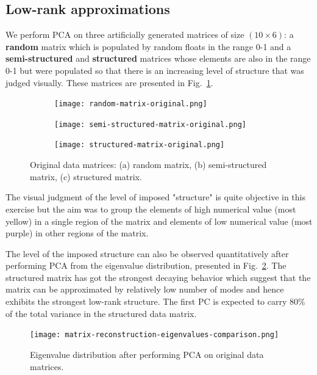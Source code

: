\documentclass[10pt,twocolumn]{article}
\begin{document}
\subsection{Low-rank approximations}

We perform PCA on three artificially generated matrices of size $(10 \times 6)$: a \textbf{random} matrix which is populated by random floats in the range 0-1 and a \textbf{semi-structured} and \textbf{structured} matrices whose elements are also in the range 0-1 but were populated so that there is an increasing level of structure that was judged visually. These matrices are presented in Fig.~\ref{fig:matrices}.

\begin{figure}[H]
\begin{subfigure}[t]{.15\textwidth}
\centering
\texttt{[image: random-matrix-original.png]}
\caption{ }
\end{subfigure}
\begin{subfigure}[t]{.15\textwidth}
\centering
\texttt{[image: semi-structured-matrix-original.png]}
\caption{ }
\end{subfigure}
\begin{subfigure}[t]{.15\textwidth}
\centering
\texttt{[image: structured-matrix-original.png]}
\caption{ }
\end{subfigure}
\caption{Original data matrices: (a) random matrix, (b) semi-structured matrix, (c) structured matrix.}
\label{fig:matrices}
\end{figure}

The visual judgment of the level of imposed "structure" is quite objective in this exercise but the aim was to group the elements of high numerical value (most yellow) in a single region of the matrix and elements of low numerical value (most purple) in other regions of the matrix.

The level of the imposed structure can also be observed quantitatively after performing PCA from the eigenvalue distribution, presented in Fig.~\ref{fig:eigenvalues}. The structured matrix has got the strongest decaying behavior which suggest that the matrix can be approximated by relatively low number of modes and hence exhibits the strongest low-rank structure. The first PC is expected to carry 80\% of the total variance in the structured data matrix.

\begin{figure}[t]
\centering\texttt{[image: matrix-reconstruction-eigenvalues-comparison.png]}
\caption{Eigenvalue distribution after performing PCA on original data matrices.}			
\label{fig:eigenvalues}
\end{figure}
\end{document}

